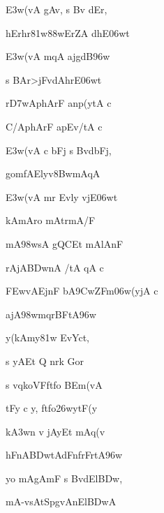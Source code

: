 \dnnemslokab 
{\dn \3E3w(vA  gAv, s Bv\? dEr, \dandadn\dontdisplaylinenum}

\dnnemslokac 
{\dn hErhr\?\381w\388wErZA dhE\306wt}
\dontdisplaylinenum

\dnnemslokad 
{\dn \3E3w(vA  m\?qA ajgd\0B\396w \vegdn\dontdisplaylinenum}


\ujvers\dnnemsloka 
{\dn s BAr>jFvdAhrE\306wt}
\dontdisplaylinenum

\dnnemslokab 
{\dn r\3D7wAphArF anp(ytA c \dandadn\dontdisplaylinenum}

\dnnemslokac 
{\dn C/AphArF apEv/tA c}
\dontdisplaylinenum

\dnnemslokad 
{\dn \3E3w(vA c bFj\2 s Bv\?dbFj, \vegdn\dontdisplaylinenum}


\ujvers\dnnemsloka 
{\dn gomfAElyv\38BwmAqA}
\dontdisplaylinenum

\dnnemslokab 
{\dn \3E3w(vA mr\2 Evly\2 v\5jE\306wt \dandadn\dontdisplaylinenum}

\dnnemslokac 
{\dn kAmAro mAtrmA/F}
\dontdisplaylinenum

\dnnemslokad 
{\dn mA\398wsA gQCEt mAlAnF \vegdn\dontdisplaylinenum}


\ujvers\dnnemsloka 
{\dn rAjA\3BDwnA\2 /tA\2 qA\2 c}
\dontdisplaylinenum

\dnnemslokab 
{\dn \3FEwv\5AEjnF{\qva} b\5A\39CwZFm\306w(yjA\2 c \dandadn\dontdisplaylinenum }

\dnnemslokac 
{\dn ajA\398wm\?qrBFtA\396w}
\dontdisplaylinenum

\dnnemslokad 
{\dn y(kAmy\?\381w\? EvYc\?t, \vegdn\dontdisplaylinenum}


\ujvers\dnnemsloka 
{\dn s yAEt Q\2 nrk\2 Gor\2}
\dontdisplaylinenum

\dnnemslokab 
{\dn s vq\0koVFftfo B\5Em(vA \dandadn\dontdisplaylinenum}

\dnnemslokac 
{\dn tFy\0 c y, ftfo\326wytF(y}
\dontdisplaylinenum

\dnnemslokad 
{\dn k\3A3w\?n v\4 jAyEt mAq(v \vegdn\dontdisplaylinenum}


\ujvers\dnnemsloka 
{\dn hFnA\3BDwtAdFnfrFrtA\396w}
\dontdisplaylinenum

\dnnemslokab 
{\dn yo mAgAmF s Bv\?dEl\3BDw, \dandadn\dontdisplaylinenum}

\dnnemslokac 
{\dn mA-vsAtSpgvAnEl\3BDwA}
\dontdisplaylinenum

